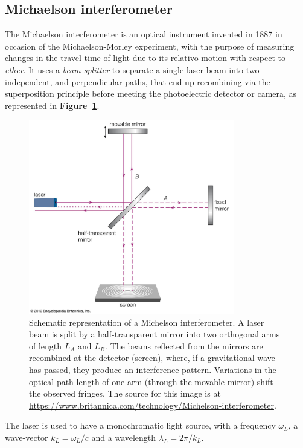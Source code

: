 \subsection{Michaelson interferometer}
The Michaelson interferometer is an optical instrument invented in 1887 in occasion of the Michaelson-Morley experiment, with the purpose of measuring changes in the travel time of light due to its relativo motion with respect to \textit{ether}.
It uses a \textit{beam splitter} to separate a single laser beam into two independent, and perpendicular paths, that end up recombining via the superposition principle before meeting the photoelectric detector or camera, as represented in \textbf{Figure~\ref{fig: michaelson interferometer}}.
\begin{figure}
    \begin{center}
        \includegraphics[width=0.8\textwidth]{images/michaelson_interferometer.jpg}
    \end{center}
    \caption{Schematic representation of a Michelson interferometer. A laser beam is split by a half-transparent mirror into two orthogonal arms of length $L_A$ and $L_B$.
    The beams reflected from the mirrors are recombined at the detector (screen), where, if a gravitational wave has passed, they produce an interference pattern.
    Variations in the optical path length of one arm (through the movable mirror) shift the observed fringes.
    The source for this image is at \url{https://www.britannica.com/technology/Michelson-interferometer}.}
    \label{fig: michaelson interferometer}
\end{figure}
The laser is used to have a monochromatic light source, with a frequency $\omega_L$, a wave-vector $k_L=\omega_L/c$ and a wavelength $\lambda_L = 2\pi/k_L$.
